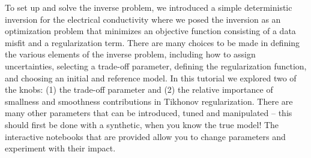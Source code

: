 \documentclass[11pt,oneside]{article}
\begin{document}
To set up and solve the inverse problem, we introduced a simple deterministic inversion for the electrical conductivity where we posed the inversion as an optimization problem that minimizes an objective function consisting of a data misfit and a regularization term. There are many choices to be made in defining the various elements of the inverse problem, including how to assign uncertainties, selecting a trade-off parameter, defining the regularization function, and choosing an initial and reference model. In this tutorial we explored two of the knobs: (1) the trade-off parameter and (2) the relative importance of smallness and smoothness contributions in Tikhonov regularization. There are many other parameters that can be introduced, tuned and manipulated -- this should first be done with a synthetic, when you know the true model! The interactive notebooks that are provided allow you to change parameters and experiment with their impact.


\clearpage

\end{document}
